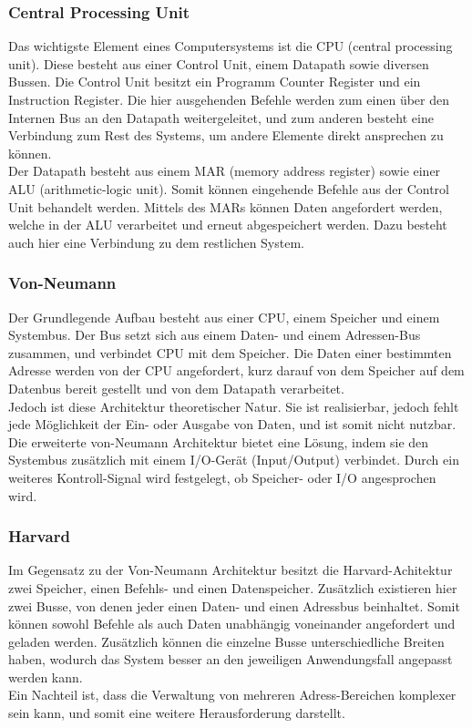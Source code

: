 \subsubsection{Central Processing Unit}
Das wichtigste Element eines Computersystems ist die CPU (central processing unit). Diese besteht aus einer Control Unit, einem Datapath sowie diversen Bussen. Die Control Unit besitzt ein Programm Counter Register und ein Instruction Register. Die hier ausgehenden Befehle werden zum einen über den Internen Bus an den Datapath weitergeleitet, und zum anderen besteht eine Verbindung zum Rest des Systems, um andere Elemente direkt ansprechen zu können.\\
Der Datapath besteht aus einem MAR (memory address register) sowie einer ALU (arithmetic-logic unit). Somit können eingehende Befehle aus der Control Unit behandelt werden. Mittels des MARs können Daten angefordert werden, welche in der ALU verarbeitet und erneut abgespeichert werden. Dazu besteht auch hier eine Verbindung zu dem restlichen System.\\

\subsubsection{Von-Neumann}
Der Grundlegende Aufbau besteht aus einer CPU, einem Speicher und einem Systembus. 
Der Bus setzt sich aus einem Daten- und einem Adressen-Bus zusammen, und verbindet CPU mit dem Speicher. Die Daten einer bestimmten Adresse werden von der CPU angefordert, kurz darauf von dem Speicher auf dem Datenbus bereit gestellt und von dem Datapath verarbeitet.\\
Jedoch ist diese Architektur theoretischer Natur. Sie ist realisierbar, jedoch fehlt jede Möglichkeit der Ein- oder Ausgabe von Daten, und ist somit nicht nutzbar.\\
Die erweiterte von-Neumann Architektur bietet eine Lösung, indem sie den Systembus zusätzlich mit einem I/O-Gerät (Input/Output) verbindet. Durch ein weiteres Kontroll-Signal wird festgelegt, ob Speicher- oder I/O angesprochen wird. 

\subsubsection{Harvard}
Im Gegensatz zu der Von-Neumann Architektur besitzt die Harvard-Achitektur zwei Speicher, einen Befehls- und einen Datenspeicher. Zusätzlich existieren hier zwei Busse, von denen jeder einen Daten- und einen Adressbus beinhaltet. Somit können sowohl Befehle als auch Daten unabhängig voneinander angefordert und geladen werden. Zusätzlich können die einzelne Busse unterschiedliche Breiten haben, wodurch das System besser an den jeweiligen Anwendungsfall angepasst werden kann.\\
Ein Nachteil ist, dass die Verwaltung von mehreren Adress-Bereichen komplexer sein kann, und somit eine weitere Herausforderung darstellt.

